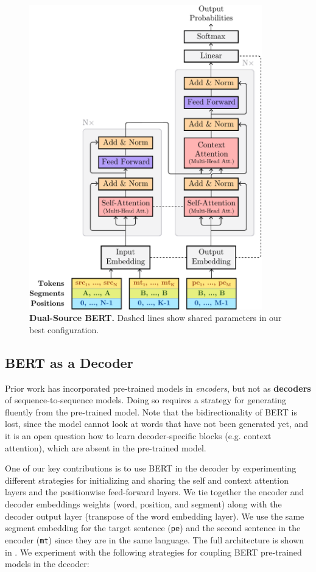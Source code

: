 \begin{figure}[ht!]
  \centering
  \includegraphics[width=0.9\textwidth]{Figures/bert-ape-diagram.pdf}
  \caption{\textbf{Dual-Source BERT.}
    Dashed lines show shared parameters in our best configuration.}
  \label{fig:transformer_diagram}
\end{figure}

\subsection{BERT as a Decoder}\label{sec:ape_bert_decoder}

Prior work has incorporated pre-trained models in {\it encoders}, but
not as {\bf decoders} of sequence-to-sequence models. Doing so
requires a strategy for generating fluently from the pre-trained
model. Note that the bidirectionality of BERT is lost, since the
model cannot look at words that have not been generated yet, and it
is an open question how to learn decoder-specific blocks (e.g.
context attention), which are absent in the pre-trained model.

One of our key contributions is to use BERT in the decoder by
experimenting different strategies for initializing and sharing the
self and context attention layers and the positionwise feed-forward
layers. We tie together the encoder and decoder embeddings weights
(word, position, and segment) along with the decoder output layer
(transpose of the word embedding layer). We use the same segment
embedding for the target sentence ({\tt pe}) and the second sentence
in the encoder ({\tt mt}) since they are in the same language. The
full architecture is shown in .
We experiment with the following strategies for coupling BERT
pre-trained models in the decoder:

